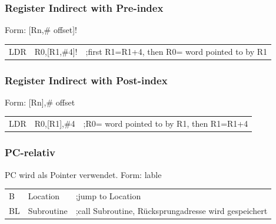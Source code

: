 \subsubsection{Register Indirect with Pre-index}
Form: [Rn,\# offset]!\newline
\begin{tabular}{lll}
   LDR & R0,[R1,\#4]! &;first R1=R1+4, then R0= word pointed to by R1  \\ 
\end{tabular} 

\subsubsection{Register Indirect with Post-index}
Form: [Rn],\# offset\newline
\begin{tabular}{lll}
    LDR& R0,[R1],\#4  &;R0= word pointed to by R1, then R1=R1+4  \\ 
\end{tabular} 

\subsubsection{PC-relativ}
PC wird als Pointer verwendet.
Form: lable\newline
\begin{tabular}{lll}
    B   &Location   &;jump to Location\\ 
    BL  &Subroutine &;call Subroutine, Rücksprungadresse wird gespeichert\\ 
\end{tabular} 

